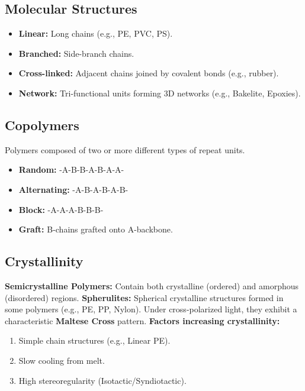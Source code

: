 \subsection{Molecular Structures}
\begin{itemize}
    \item \textbf{Linear:} Long chains (e.g., PE, PVC, PS).
    \item \textbf{Branched:} Side-branch chains.
    \item \textbf{Cross-linked:} Adjacent chains joined by covalent bonds (e.g., rubber).
    \item \textbf{Network:} Tri-functional units forming 3D networks (e.g., Bakelite, Epoxies).
\end{itemize}

\subsection{Copolymers}
Polymers composed of two or more different types of repeat units.
\begin{itemize}
    \item \textbf{Random:} -A-B-B-A-B-A-A-
    \item \textbf{Alternating:} -A-B-A-B-A-B-
    \item \textbf{Block:} -A-A-A-B-B-B-
    \item \textbf{Graft:} B-chains grafted onto A-backbone.
\end{itemize}

\subsection{Crystallinity}
\textbf{Semicrystalline Polymers:} Contain both crystalline (ordered) and amorphous (disordered) regions.
\textbf{Spherulites:} Spherical crystalline structures formed in some polymers (e.g., PE, PP, Nylon). Under cross-polarized light, they exhibit a characteristic \textbf{Maltese Cross} pattern.
\textbf{Factors increasing crystallinity:}
\begin{enumerate}
    \item Simple chain structures (e.g., Linear PE).
    \item Slow cooling from melt.
    \item High stereoregularity (Isotactic/Syndiotactic).
\end{enumerate}
